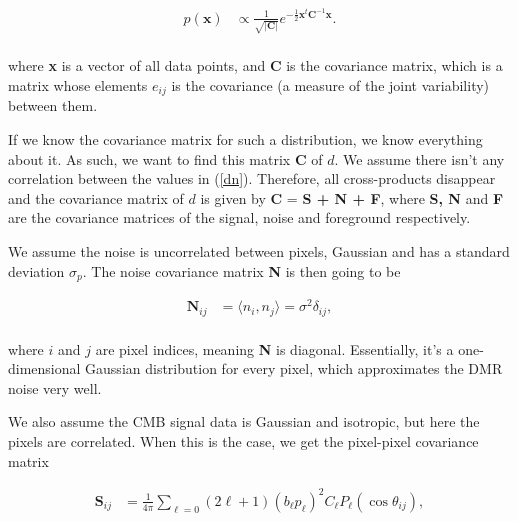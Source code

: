 \documentclass{emulateapj}
\begin{document}
 \begin{equation}
 \label{gauss}
 \begin{array}{rl}
 p(\textbf{x})  &\propto \frac{1}{\sqrt{|\textbf{C}|}}e^{-\frac{1}{2}\textbf{x}^{t}\textbf{C}^{-1}\textbf{x}}. \\
 \end{array}
 \end{equation}
 
 \noindent 
  where \textbf{x} is a vector of all data points, and \textbf{C} is the covariance matrix, which is a matrix whose elements $e_{ij}$ is the covariance (a measure of the joint variability) between them.
  
    
  If we know the covariance matrix for such a distribution, we know everything about it. As such, we want to find this matrix \textbf{C} of $d$. We assume there isn't any correlation between the values in (\ref{dn}). Therefore, all cross-products disappear and the covariance matrix of $d$ is given by \textbf{C} = \textbf{S + N + F}, where \textbf{S, N} and \textbf{F} are the covariance matrices of the signal, noise and foreground respectively.
 
 We assume the noise is uncorrelated between pixels, Gaussian and has a standard deviation $\sigma_p$. The noise covariance matrix \textbf{N} is then going to be
 
  \begin{equation}
  \label{N_cov}
  \begin{array}{rl}
 \textbf{N}_{ij}  &= \langle n_i,n_j \rangle = \sigma^2\delta_{ij}, \\
  \end{array}
  \end{equation}

\noindent 
where $i$ and $j$ are pixel indices, meaning \textbf{N} is diagonal. Essentially, it's a one-dimensional Gaussian distribution for every pixel, which approximates the DMR noise very well.

We also assume the CMB signal data is Gaussian and isotropic, but here the pixels are correlated. When this is the case, we get the pixel-pixel covariance matrix 


  \begin{equation}
  \label{s_cov}
  \begin{array}{rl}
  \textbf{S}_{ij}  &= \frac{1}{4\pi} \sum_{\ell = 0}^{}(2\ell + 1)(b_{\ell}p_{\ell})^2C_{\ell}P_{\ell}(\cos \theta_{ij}), \\
  \end{array}
  \end{equation}
  
\end{document}
